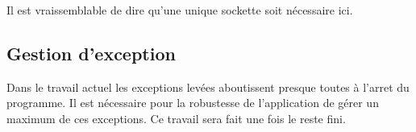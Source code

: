 Il est vraissemblable de dire qu'une unique sockette soit nécessaire ici. 


\subsection*{Gestion d'exception}
Dans le travail actuel les exceptions levées aboutissent presque toutes à l'arret du programme. Il est nécessaire pour la robustesse de l'application de gérer un maximum de ces exceptions. Ce travail sera fait une fois le reste fini.


